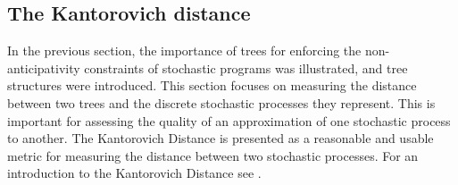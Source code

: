 \begin{comment}
The most common way to think about stochastic processes is, however, in terms of its probability measure $\mathbb{P}$.
For the purpose of this discussion, let $\Omega=\mathbb{R}^n$ and $\zeta=id$.
Each of the elements of the stochastic process except for the probability measure is fixed, and the stochastic process is considered in terms of the space of probability measures.
This interpretation will be followed throughout this paper.

The choice of the space of probability measures as the underlying space for stochastic processes leads to much more difficulties when defining a metric.
It is not feasible to regard two probability measures $\mathbb{P}_1$ and $\mathbb{P}_2$ as integrable functions and elements of $L^p$ for two reasons:
\begin{enumerate}
\item The metric between two stochastic processes $\xi_1$ and $\xi_2$ would be defined in terms of the $L^p$-norm between their probability measures $\mathbb{P}_1$ and $\mathbb{P}_2$:
  \begin{equation}
    \label{eq:prob-measure-metric-as-Lpnorm}
    D(\mathbb{P}_1,\mathbb{P}_2) := \left\Vert \mathbb{P}_1-\mathbb{P}_2\right\Vert = \sum_{t=1}^T\int_{\omega\in\Omega}\left\Vert \mathbb{P}_{1,t}(\omega)-\mathbb{P}_{2,t}(\omega)\right\Vert
  \end{equation}
  This does, however, not yield meaningful results.
See figure \ref{fig:example-wrong-distance} for an example.
\item The definition of the above metric makes use of the point wise difference of $\mathbb{P}_1$ and $\mathbb{P}_2$
  This difference is, however, not a meaningful construction, since the difference of two probability measure functions is itself \textbf{never} a probability measure.
\end{enumerate}

\end{comment}
\subsection{The Kantorovich distance}
\label{sec:kantoro}
In the previous section, the importance of trees for enforcing the non-anticipativity constraints of stochastic programs was illustrated, and tree structures were introduced.
This section focuses on measuring the distance between two trees and the discrete stochastic processes they represent.
This is important for assessing the quality of an approximation of one stochastic process to another.
The Kantorovich Distance is presented as a reasonable and usable metric for measuring the distance between two stochastic processes.
For an introduction to the Kantorovich Distance see \citet{Deng2009}.

